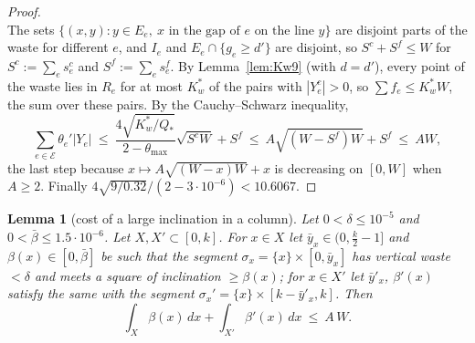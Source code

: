 \documentclass[11pt]{amsart}
\newtheorem{lemma}[theorem]{Lemma}
\theoremstyle{definition}
\theoremstyle{remark}
\begin{document}
\begin{proof}
\[\]
The sets $\{(x,y):y\in E_e,\ x\text{ in the gap of }e\text{ on the line }y\}$ are disjoint parts of the waste for different
$e$, and $I_e$ and $E_e\cap\{g_e\ge d'\}$ are disjoint, so $S^c+S^f\le W$ for $S^c:=\sum_es_e^c$ and $S^f:=\sum_es_e^f$. By
Lemma~\ref{lem:Kw9} (with $d=d'$), every point of the waste lies in $R_e$ for at most $K_w^*$ of the pairs with $|Y_e^c|>0$, so
$\sum f_e\le K_w^*W$, the sum over these pairs. By the Cauchy--Schwarz inequality,
\[
\sum_{e\in\mathcal E}\theta_e'|Y_e|\ \le\ \frac{4\sqrt{K_w^*/Q_*}}{2-\theta_{\max}}\sqrt{S^cW}+S^f\ \le\ A\sqrt{(W-S^f)W}+S^f\ \le\ AW,
\]
the last step because $x\mapsto A\sqrt{(W-x)W}+x$ is decreasing on $[0,W]$ when $A\ge2$. Finally $4\sqrt{9/0.32}/(2-3\cdot10^{-6})<10.6067$.
\end{proof}

\begin{lemma}[cost of a large inclination in a column]\label{lem:Bv}
Let $0<\delta\le10^{-5}$ and $0<\bar\beta\le1.5\cdot10^{-6}$. Let $X,X'\subset[0,k]$. For $x\in X$ let $\bar y_x\in(0,\frac k2-1]$ and
$\beta(x)\in[0,\bar\beta]$ be such that the segment $\sigma_x=\{x\}\times[0,\bar y_x]$ has vertical waste $<\delta$ and meets a square of
inclination $\ge\beta(x)$; for $x\in X'$ let $\bar y'_x$, $\beta'(x)$ satisfy the same with the segment
$\sigma_x'=\{x\}\times[k-\bar y'_x,k]$. Then
\[
\int_X\beta(x)\,dx+\int_{X'}\beta'(x)\,dx\ \le\ A\,W .
\]
\end{lemma}
\end{document}
